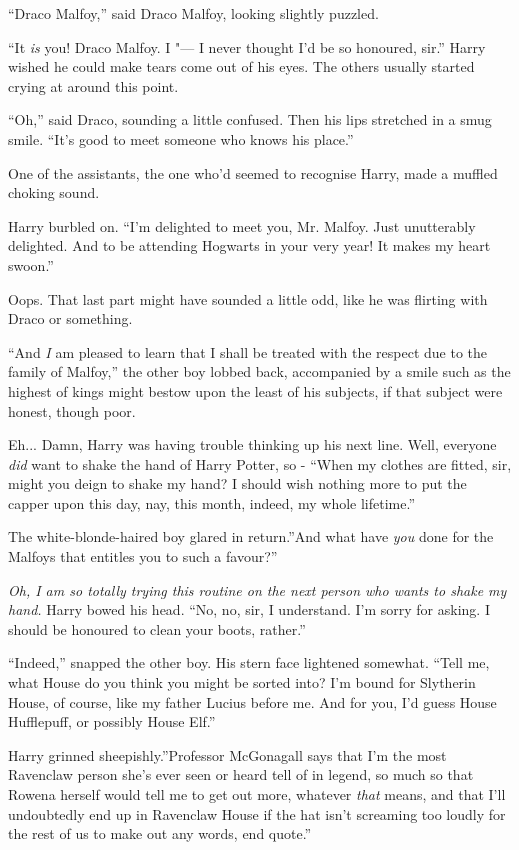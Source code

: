 ``Draco Malfoy,'' said Draco Malfoy, looking slightly puzzled.

``It \emph{is} you! Draco Malfoy. I "--- I never thought I'd be so honoured,
sir.'' Harry wished he could make tears come out of his eyes. The others
usually started crying at around this point.

``Oh,'' said Draco, sounding a little confused. Then his lips stretched
in a smug smile. ``It's good to meet someone who knows his place.''

One of the assistants, the one who'd seemed to recognise Harry, made a
muffled choking sound.

Harry burbled on. ``I'm delighted to meet you, Mr. Malfoy. Just
unutterably delighted. And to be attending Hogwarts in your very year!
It makes my heart swoon.''

Oops. That last part might have sounded a little odd, like he was
flirting with Draco or something.

``And \emph{I} am pleased to learn that I shall be treated with the
respect due to the family of Malfoy,'' the other boy lobbed back,
accompanied by a smile such as the highest of kings might bestow upon
the least of his subjects, if that subject were honest, though poor.

Eh... Damn, Harry was having trouble thinking up his next line.
Well, everyone \emph{did} want to shake the hand of Harry Potter, so -
``When my clothes are fitted, sir, might you deign to shake my hand? I
should wish nothing more to put the capper upon this day, nay, this
month, indeed, my whole lifetime.''

The white-blonde-haired boy glared in return.''And what have \emph{you}
done for the Malfoys that entitles you to such a favour?''

\emph{Oh, I am so totally trying this routine on the next person who
wants to shake my hand.} Harry bowed his head. ``No, no, sir, I
understand. I'm sorry for asking. I should be honoured to clean your
boots, rather.''

``Indeed,'' snapped the other boy. His stern face lightened somewhat.
``Tell me, what House do you think you might be sorted into? I'm bound
for Slytherin House, of course, like my father Lucius before me. And for
you, I'd guess House Hufflepuff, or possibly House Elf.''

Harry grinned sheepishly.''Professor McGonagall says that I'm the most
Ravenclaw person she's ever seen or heard tell of in legend, so much so
that Rowena herself would tell me to get out more, whatever \emph{that}
means, and that I'll undoubtedly end up in Ravenclaw House if the hat
isn't screaming too loudly for the rest of us to make out any words, end
quote.''

